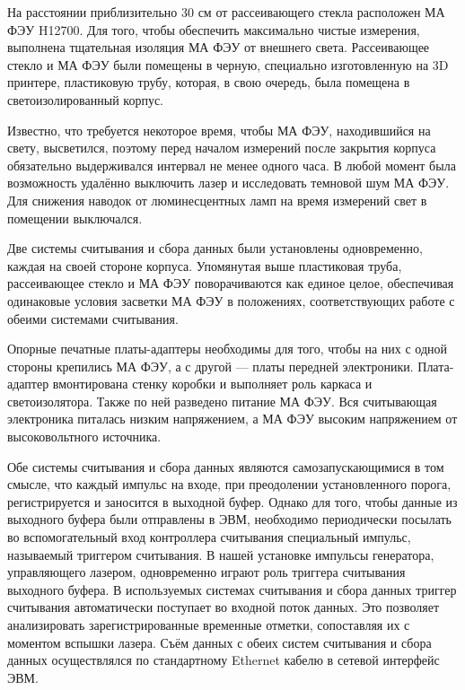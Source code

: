 На расстоянии приблизительно 30 см от рассеивающего стекла расположен МА ФЭУ H12700. Для того, чтобы обеспечить максимально чистые измерения, выполнена тщательная изоляция МА ФЭУ от внешнего света. Рассеивающее стекло и МА ФЭУ были помещены в черную, специально изготовленную на 3D принтере, пластиковую трубу, которая, в свою очередь, была помещена в светоизолированный корпус.

Известно, что требуется некоторое время, чтобы МА ФЭУ, находившийся на свету, высветился, поэтому перед началом измерений после закрытия корпуса обязательно выдерживался интервал не менее одного часа. В любой момент была возможность удалённо выключить лазер и исследовать темновой шум МА ФЭУ. Для снижения наводок от люминесцентных ламп на время измерений свет в помещении выключался.

Две системы считывания и сбора данных были установлены одновременно, каждая на своей стороне корпуса. Упомянутая выше пластиковая труба, рассеивающее стекло и МА ФЭУ поворачиваются как единое целое, обеспечивая одинаковые условия засветки МА ФЭУ в положениях, соответствующих работе с обеими системами считывания.

Опорные печатные платы-адаптеры необходимы для того, чтобы на них с одной стороны крепились МА ФЭУ, а с другой --- платы передней электроники. Плата-адаптер вмонтирована стенку коробки и выполняет роль каркаса и светоизолятора. Также по ней разведено питание МА ФЭУ. Вся считывающая электроника питалась низким напряжением, а МА ФЭУ высоким напряжением от высоковольтного источника.

Обе системы считывания и сбора данных являются самозапускающимися в том смысле, что каждый импульс на входе, при преодолении установленного порога, регистрируется и заносится в выходной буфер. Однако для того, чтобы данные из выходного буфера были отправлены в ЭВМ, необходимо периодически посылать во вспомогательный вход контроллера считывания специальный импульс, называемый триггером считывания. В нашей установке импульсы генератора, управляющего лазером, одновременно играют роль триггера считывания выходного буфера. В используемых системах считывания и сбора данных триггер считывания автоматически поступает во входной поток данных. Это позволяет анализировать зарегистрированные временные отметки, сопоставляя их с моментом вспышки лазера. Съём данных с обеих систем считывания и сбора данных осуществлялся по стандартному Ethernet кабелю в сетевой интерфейс ЭВМ.
